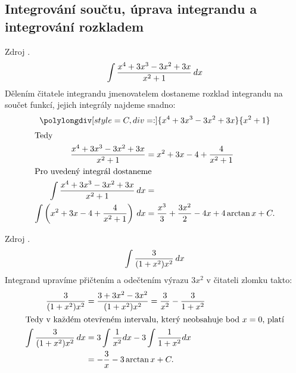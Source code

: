     \subsection{Integrování součtu, úprava integrandu a integrování rozkladem}
      \begin{example}
        Zdroj \cite[s.~29]{Knichal}.
        \begin{equation}\label{MA:int_ex_01}
          \int{\frac{x^4+3x^3-3x^2+3x}{x^2+1}\hspace{2pt}dx}
        \end{equation}
        Dělením čitatele integrandu jmenovatelem  dostaneme rozklad integrandu na součet funkcí,
        jejich integrály najdeme snadno:
         \begin{equation*} 
           \polylongdiv[style=C,div=:]{x^4+3x^3-3x^2+3x}{x^2+1}
         \end{equation*}
         \begin{align*}
           \shortintertext{Tedy}
           \frac{x^4+3x^3-3x^2+3x}{x^2+1}                 &= x^2+3x-4+\frac{4}{x^2+1} \\
           \intertext{Pro uvedený integrál dostaneme} 
           \int{\frac{x^4+3x^3-3x^2+3x}{x^2+1}\hspace{2pt}dx}        &=                 \\
           \int{\left(x^2+3x-4+\frac{4}{x^2+1}\right)\hspace{2pt}dx} &= 
             \frac{x^3}{3}+\frac{3x^2}{2}-4x+4\arctan x + C.
         \end{align*}
      \end{example}
      
      \begin{example}
        Zdroj \cite[s.~29]{Knichal}.
        \begin{equation}\label{MA:int_ex_03}
          \int\frac{3}{(1+x^2)x^2}\hspace{2pt}dx
        \end{equation}
        Integrand upravíme přičtením a odečtením výrazu $3x^2$ v čitateli zlomku takto:
        \begin{align*}
          \frac{3}{(1+x^2)x^2} 
            &= \frac{3+3x^2-3x^2}{(1+x^2)x^2} = \frac{3}{x^2}-\frac{3}{1+x^2}                      \\  
          \intertext{Tedy v každém otevřeném intervalu, který neobsahuje bod \(x=0\), platí}
          \int{\frac{3}{(1+x^2)x^2}\hspace{2pt}dx} 
            &= 3\int{\frac{1}{x^2}dx} - 3\int{\frac{1}{1+x^2}dx}                                   \\
            &= -\frac{3}{x}-3\arctan x + C. 
        \end{align*}
      \end{example}
      
